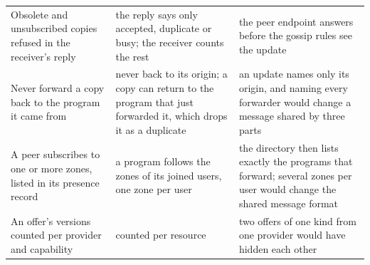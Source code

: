 \begin{table}[!htb]
\begin{tabularx}{\linewidth}{@{}P{3.9cm}P{4.1cm}L@{}}
Obsolete and unsubscribed copies refused in the receiver's reply & the reply says only accepted, duplicate or busy; the receiver counts the rest & the peer endpoint answers before the gossip rules see the update \\ %
Never forward a copy back to the program it came from & never back to its origin; a copy can return to the program that just forwarded it, which drops it as a duplicate & an update names only its origin, and naming every forwarder would change a message shared by three parts \\ %
A peer subscribes to one or more zones, listed in its presence record & a program follows the zones of its joined users, one zone per user & the directory then lists exactly the programs that forward; several zones per user would change the shared message format \\ %
An offer's versions counted per provider and capability & counted per resource & two offers of one kind from one provider would have hidden each other \\ %
\bottomrule
\end{tabularx}
\end{table}

